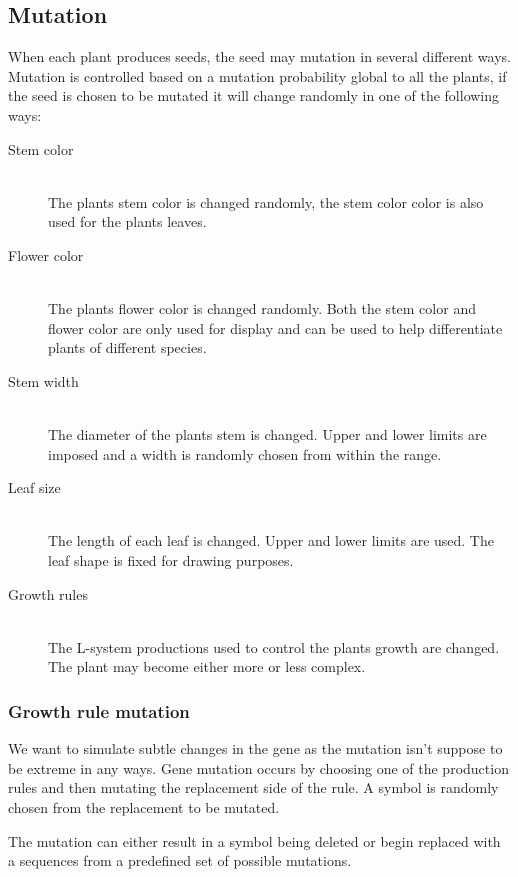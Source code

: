 \documentclass[conference]{acmsiggraph}
\begin{document}
\subsection{Mutation}

When each plant produces seeds, the seed may mutation in several different
ways. Mutation is controlled based on a mutation probability global to all the
plants, if the seed is chosen to be mutated it will change randomly in one of
the following ways:

\begin{description}
  \item[Stem color]   \hfill \\
    The plants stem color is changed randomly, the stem color color is also used
    for the plants leaves.
  \item[Flower color] \hfill \\
    The plants flower color is changed randomly. Both the stem color and flower
    color are only used for display and can be used to help differentiate plants
    of different species.
  \item[Stem width]   \hfill \\
    The diameter of the plants stem is changed. Upper and lower limits are
    imposed and a width is randomly chosen from within the range.
  \item[Leaf size]    \hfill \\
    The length of each leaf is changed. Upper and lower limits are used. The
    leaf shape is fixed for drawing purposes.
  \item[Growth rules] \hfill \\
    The L-system productions used to control the plants growth are changed. The
    plant may become either more or less complex.
\end{description}

\subsubsection{Growth rule mutation}

We want to simulate subtle changes in the gene as the mutation isn't suppose to
be extreme in any ways. Gene mutation occurs by choosing one of the production
rules and then mutating the replacement side of the rule. A symbol is randomly
chosen from the replacement to be mutated.

The mutation can either result in a symbol being deleted or begin replaced with
a sequences from a predefined set of possible mutations.
\end{document}
